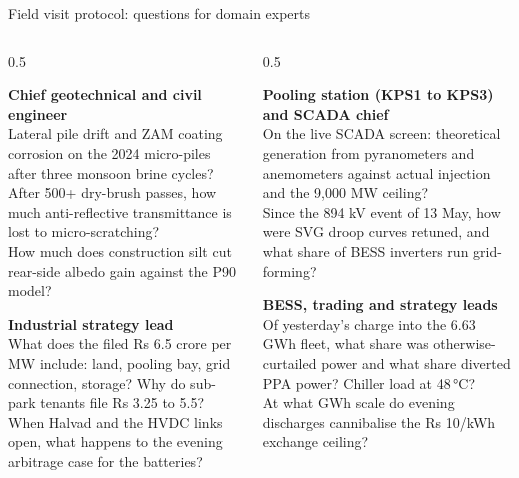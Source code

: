 \documentclass[10pt,aspectratio=169]{beamer}
\newcommand{\card}[3]{\begin{tcolorbox}[colback=#1,colframe=#2,arc=3pt,left=2.5mm,right=2.5mm,top=0.8mm,bottom=0.8mm,boxsep=0.3mm]{\footnotesize\textbf{#3}}\\[1pt]\scriptsize}
\begin{document}
\begin{frame}[t]{Field visit protocol: questions for domain experts}
  \begin{columns}[T]
    \begin{column}{0.5\textwidth}
      \card{SpLightGray}{SpLightGray}{Chief geotechnical and civil engineer}
        Lateral pile drift and ZAM coating corrosion on the 2024 micro-piles after three monsoon brine cycles?\\[1pt]
        After 500+ dry-brush passes, how much anti-reflective transmittance is lost to micro-scratching?\\[1pt]
        How much does construction silt cut rear-side albedo gain against the P90 model?
      \end{tcolorbox}
      \card{white}{Grey}{Industrial strategy lead}
        What does the filed Rs 6.5 crore per MW include: land, pooling bay, grid connection, storage? Why do sub-park tenants file Rs 3.25 to 5.5?\\[1pt]
        When Halvad and the HVDC links open, what happens to the evening arbitrage case for the batteries?
      \end{tcolorbox}
    \end{column}
    \begin{column}{0.5\textwidth}
      \card{white}{Grey}{Pooling station (KPS1 to KPS3) and SCADA chief}
        On the live SCADA screen: theoretical generation from pyranometers and anemometers against actual injection and the 9,000 MW ceiling?\\[1pt]
        Since the 894 kV event of 13 May, how were SVG droop curves retuned, and what share of BESS inverters run grid-forming?
      \end{tcolorbox}
      \card{OrangeTint}{OrangeTint}{BESS, trading and strategy leads}
        Of yesterday's charge into the 6.63 GWh fleet, what share was otherwise-curtailed power and what share diverted PPA power? Chiller load at 48\,°C?\\[1pt]
        At what GWh scale do evening discharges cannibalise the Rs 10/kWh exchange ceiling?
      \end{tcolorbox}
    \end{column}
  \end{columns}
\end{frame}
\end{document}
